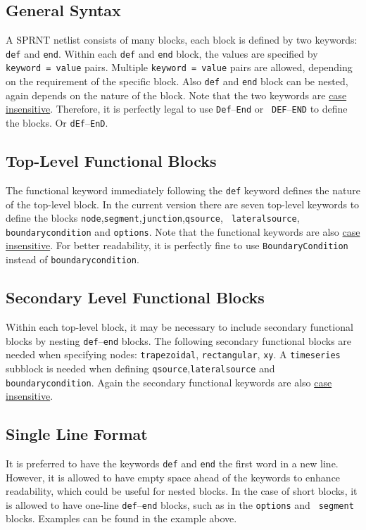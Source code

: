 \documentclass[10pt, letterpaper]{article}
\begin{document}
\subsection{General Syntax}
\label{subsec:syntax}
A SPRNT netlist consists of many blocks, each block is defined by two keywords: {\tt def}
and {\tt end}. Within each {\tt def} and {\tt end} block, the values are specified by {\tt
keyword = value} pairs. Multiple {\tt keyword = value} pairs are allowed, depending on the
requirement of the specific block. Also {\tt def} and {\tt end} block can be nested, again depends
on the nature of the block.  Note that the two keywords are \underline{case
  insensitive}. Therefore, it is perfectly legal to use {\tt Def}--{\tt End} or {\tt
  DEF}--{\tt END} to define the blocks. Or {\tt dEf}--{\tt EnD}.


\subsection{Top-Level Functional Blocks}
\label{subsec:toplevel}
The functional keyword immediately following the {\tt def} keyword defines the nature of the
top-level block. In the current version there are seven top-level keywords to
define the blocks {\tt node},{\tt segment},{\tt junction},{\tt qsource}, {\tt
  lateralsource}, {\tt boundarycondition} and {\tt options}. Note that the functional
keywords are also \underline{case insensitive}. For better readability, it is perfectly
fine to use {\tt BoundaryCondition} instead of {\tt boundarycondition}. 

\subsection{Secondary Level Functional Blocks}
\label{subsec:secondlevel}
Within each top-level block, it may be necessary to include secondary functional blocks by
nesting {\tt def}--{\tt end} blocks. The following secondary functional blocks are needed
when specifying nodes: {\tt trapezoidal}, {\tt rectangular}, {\tt xy}. A {\tt timeseries}
subblock is needed when defining {\tt qsource},{\tt lateralsource} and {\tt
  boundarycondition}. Again the secondary functional keywords are also \underline{case
  insensitive}.

\subsection{Single Line Format}
\label{subsec:single}
It is preferred to have the keywords {\tt def} and {\tt end} the first word in a new
line. However, it is allowed to have empty space ahead of the keywords to enhance
readability, which could be useful for nested blocks. In the case of short blocks, it is
allowed to have one-line {\tt def}--{\tt end} blocks, such as in the {\tt options} and {\tt
  segment} blocks. Examples can be found in the example above.
\end{document}

